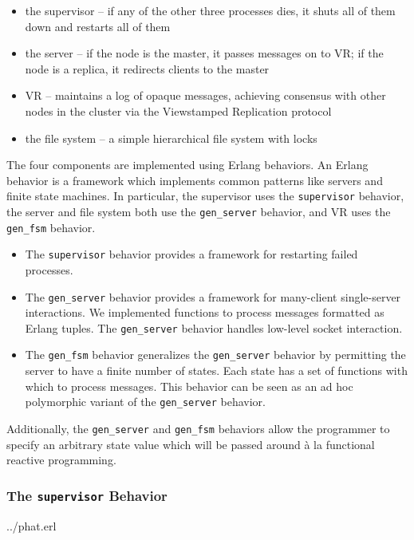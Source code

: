 \documentclass[10pt,letter]{article}
\begin{document}
\begin{itemize}
\item the supervisor -- if any of the other three processes dies, it shuts all
  of them down and restarts all of them
\item the server -- if the node is the master, it passes messages on to VR; if
  the node is a replica, it redirects clients to the master
\item VR -- maintains a log of opaque messages, achieving consensus with other
  nodes in the cluster via the Viewstamped Replication protocol
\item the file system -- a simple hierarchical file system with locks
\end{itemize}

The four components are implemented using Erlang behaviors. An Erlang behavior
is a framework which implements common patterns like servers and finite state
machines. In particular, the supervisor uses the \texttt{supervisor} behavior,
the server and file system both use the \texttt{gen\_server} behavior, and VR
uses the \texttt{gen\_fsm} behavior.

\begin{itemize}
\item The \texttt{supervisor} behavior provides a framework for restarting
  failed processes.
\item The \texttt{gen\_server} behavior provides a framework for many-client
  single-server interactions. We implemented functions to process messages
  formatted as Erlang tuples. The \texttt{gen\_server} behavior handles
  low-level socket interaction.
\item The \texttt{gen\_fsm} behavior generalizes the \texttt{gen\_server}
  behavior by permitting the server to have a finite number of states. Each
  state has a set of functions with which to process messages. This behavior can
  be seen as an ad hoc polymorphic variant of the \texttt{gen\_server} behavior.
\end{itemize}

Additionally, the \texttt{gen\_server} and \texttt{gen\_fsm} behaviors allow
the programmer to specify an arbitrary state value which will be passed around
\`{a} la functional reactive programming.

\subsubsection{The \texttt{supervisor} Behavior}


                {../phat.erl}
\end{document}

